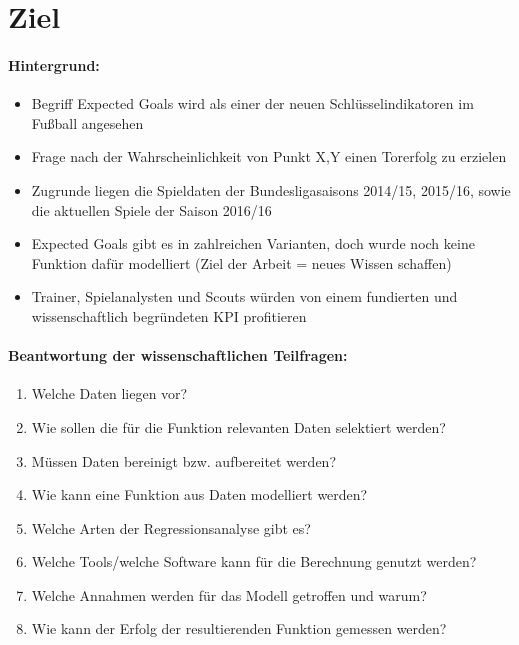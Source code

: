 \section{Ziel}

\paragraph{Hintergrund:}
\begin{itemize}
\item Begriff Expected Goals wird als einer der neuen Schlüsselindikatoren im Fußball angesehen
\item Frage nach der Wahrscheinlichkeit von Punkt X,Y einen Torerfolg zu erzielen
\item Zugrunde liegen die Spieldaten der Bundesligasaisons 2014/15, 2015/16, sowie die aktuellen Spiele der Saison 2016/16
\item Expected Goals gibt es in zahlreichen Varianten, doch wurde noch keine Funktion dafür modelliert (Ziel der Arbeit = neues Wissen schaffen)
\item Trainer, Spielanalysten und Scouts würden von einem fundierten und wissenschaftlich begründeten KPI profitieren
\end{itemize}

\paragraph{Beantwortung der wissenschaftlichen Teilfragen:}
\begin{enumerate}
\item Welche Daten liegen vor?
\item Wie sollen die für die Funktion relevanten Daten selektiert werden?
\item Müssen Daten bereinigt bzw. aufbereitet werden?
\item Wie kann eine Funktion aus Daten modelliert werden?
\item Welche Arten der Regressionsanalyse gibt es?
\item Welche Tools/welche Software kann für die Berechnung genutzt werden?
\item Welche Annahmen werden für das Modell getroffen und warum?
\item Wie kann der Erfolg der resultierenden Funktion gemessen werden?
\end{enumerate}
